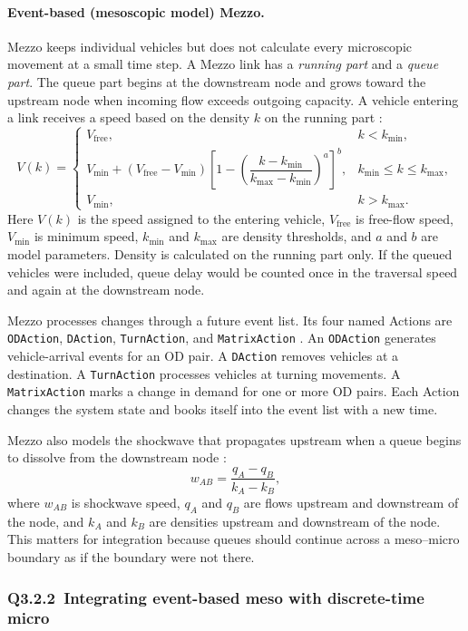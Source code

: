 \begin{bibunit}[plainnat]
\paragraph*{Event-based (mesoscopic model) Mezzo.}
Mezzo keeps individual vehicles but does not calculate every microscopic
movement at a small time step. A Mezzo link has a \textit{running part} and a
\textit{queue part}. The queue part begins at the downstream node and grows
toward the upstream node when incoming flow exceeds outgoing capacity. A vehicle
entering a link receives a speed based on the density $k$ on the running part
\citep{burghout2006discrete}:
\[
V(k)=
\begin{cases}
V_{\mathrm{free}}, & k<k_{\min},\\[2pt]
V_{\min}+(V_{\mathrm{free}}-V_{\min})
\left[1-\left(\dfrac{k-k_{\min}}{k_{\max}-k_{\min}}\right)^a\right]^b,
& k_{\min}\leq k\leq k_{\max},\\[2pt]
V_{\min}, & k>k_{\max}.
\end{cases}
\]
Here $V(k)$ is the speed assigned to the entering vehicle, $V_{\mathrm{free}}$
is free-flow speed, $V_{\min}$ is minimum speed, $k_{\min}$ and $k_{\max}$ are
density thresholds, and $a$ and $b$ are model parameters. Density is calculated
on the running part only. If the queued vehicles were included, queue delay
would be counted once in the traversal speed and again at the downstream node.

Mezzo processes changes through a future event list. Its four named Actions are
\texttt{ODAction}, \texttt{DAction}, \texttt{TurnAction}, and
\texttt{MatrixAction} \citep{burghout2004thesis}. An \texttt{ODAction}
generates vehicle-arrival events for an OD pair. A \texttt{DAction} removes
vehicles at a destination. A \texttt{TurnAction} processes vehicles at turning
movements. A \texttt{MatrixAction} marks a change in demand for one or more OD
pairs. Each Action changes the system state and books itself into the event list
with a new time.

Mezzo also models the shockwave that propagates upstream when a queue begins to
dissolve from the downstream node \citep{burghout2006discrete}:
\[
  w_{AB}=\frac{q_A-q_B}{k_A-k_B},
\]
where $w_{AB}$ is shockwave speed, $q_A$ and $q_B$ are flows upstream and
downstream of the node, and $k_A$ and $k_B$ are densities upstream and
downstream of the node. This matters for integration because queues should
continue across a meso--micro boundary as if the boundary were not there.

\subsubsection{Q3.2.2\ Integrating event-based meso with discrete-time micro}


\end{bibunit}
